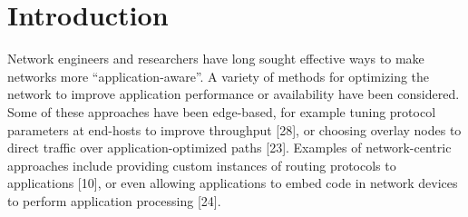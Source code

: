 \documentclass[runningheads,a4paper]{llncs}
\begin{document}
\section{Introduction}
Network engineers and researchers have long sought effective ways to make networks more “application-aware”. A variety of methods for optimizing the network to improve application performance or availability have been considered. Some of these approaches have been edge-based, for example tuning protocol parameters at end-hosts to improve throughput [28], or choosing overlay nodes to direct traffic over application-optimized paths [23]. Examples of network-centric approaches include providing custom instances of routing protocols to applications [10], or even allowing applications to embed code in network devices to perform application processing [24].
\end{document}
